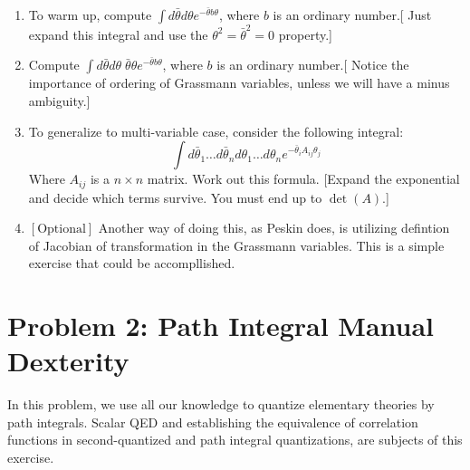 \documentclass[11pt]{article}
\begin{document}
\begin{enumerate}
\begin{problem}{\points[9.5 Peskin]{-}}
		\begin{enumerate}
			\item To warm up, compute $\int d\bar{\theta}d\theta e^{-\bar{\theta}b\theta}$, where $b$ is an ordinary number.[ Just expand this integral and use the $\theta^2= \bar{\theta}^2 =0$ property.]
			\item Compute $\int d\bar{\theta}d\theta\;\bar{\theta}\theta e^{-\bar{\theta}b\theta}$, where $b$ is an ordinary number.[ Notice the importance of ordering of Grassmann variables, unless we will have a minus ambiguity.]
			\item To generalize to multi-variable case, consider the following integral:
			\[
			\int d\bar{\theta}_1 \dots  d\bar{\theta}_n d\theta_1 \dots d\theta_n e^{-\bar{\theta}_i A_{ij} \theta_j}
			\]
			Where $A_{ij}$ is a $n\times n$ matrix. Work out this formula. [Expand the exponential and decide which terms survive. You must end up to $\det(A)$.]
			\item $[\text{Optional}]$ Another way of doing this, as Peskin does, is utilizing defintion of Jacobian of transformation in the Grassmann variables. This is a simple exercise that could be accompllished.

			
		\end{enumerate}
	\end{problem}
\end{enumerate}



\newpage

\section*{Problem 2: Path Integral Manual Dexterity}
\begin{problem}
	In this problem, we use all our knowledge to quantize elementary theories by path integrals. 
	Scalar QED and establishing the equivalence of correlation functions in second-quantized and path integral quantizations, are subjects of this exercise.
\end{problem}	
\end{document}
